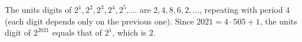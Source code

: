 The units digits of $2^1,2^2,2^3,2^4,2^5,\dots$ are $2,4,8,6,2,\dots$, repeating with period $4$ (each digit depends only on the previous one). Since $2021=4\cdot505+1$, the units digit of $2^{2021}$ equals that of $2^1$, which is $\boxed{2}$.
